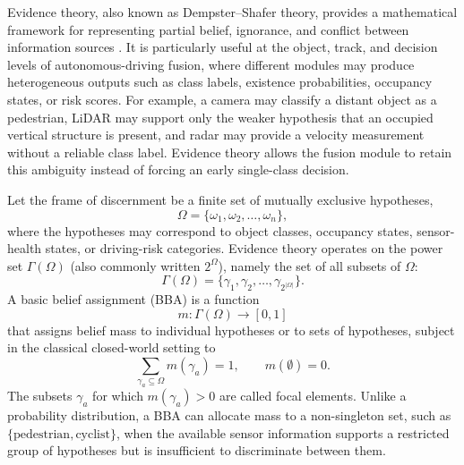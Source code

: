 \documentclass[11pt,oneside,openany]{book}
\newcommand{\added}[1]{\textcolor{RevisionBlue}{#1}}
\begin{document}
Evidence theory, also known as Dempster--Shafer theory, provides a mathematical framework for representing partial belief, ignorance, and conflict between information sources \cite{shafer_mathematical_1976,dempster_upperlower_2008,smets_transferable_1990}. It is particularly useful at the object, track, and decision levels of autonomous-driving fusion, where different modules may produce heterogeneous outputs such as class labels, existence probabilities, occupancy states, or risk scores. For example, a camera may classify a distant object as a pedestrian, LiDAR may support only the weaker hypothesis that an occupied vertical structure is present, and radar may provide a velocity measurement without a reliable class label. Evidence theory allows the fusion module to retain this ambiguity instead of forcing an early single-class decision.

Let the frame of discernment be a finite set of mutually exclusive hypotheses,
\begin{equation}
\Omega = \{\omega_1, \omega_2, \ldots, \omega_n\},
\end{equation}
where the hypotheses may correspond to object classes, occupancy states, sensor-health states, or driving-risk categories. Evidence theory operates on the power set \(\Gamma(\Omega)\) \added{(also commonly written $2^{\Omega}$)}, namely the set of all subsets of \(\Omega\):
\begin{equation}
\Gamma(\Omega) = \{\gamma_1, \gamma_2, \ldots, \gamma_{2^{|\Omega|}}\}.
\end{equation}
A basic belief assignment (BBA) is a function
\begin{equation}
m: \Gamma(\Omega) \rightarrow [0,1]
\end{equation}
that assigns belief mass to individual hypotheses or to sets of hypotheses, subject in the classical closed-world setting to
\begin{equation}
\sum_{\gamma_a \subseteq \Omega} m(\gamma_a)=1, \qquad m(\emptyset)=0.
\label{eq:bba}
\end{equation}
The subsets \(\gamma_a\) for which \(m(\gamma_a)>0\) are called focal elements. Unlike a probability distribution, a BBA can allocate mass to a non-singleton set, such as \(\{\text{pedestrian},\text{cyclist}\}\), when the available sensor information supports a restricted group of hypotheses but is insufficient to discriminate between them.
\end{document}
